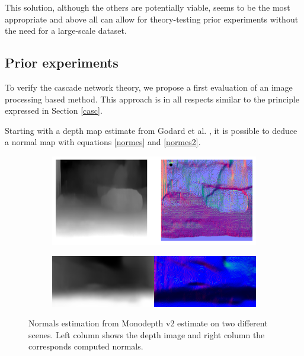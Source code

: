 This solution, although the others are potentially viable, seems to be the most appropriate and above all can allow for theory-testing prior experiments without the need for a large-scale dataset.

\subsection{Prior experiments}

To verify the cascade network theory, we propose a first evaluation of an image processing based method. This approach is in all respects similar to the principle expressed in Section \ref{casc}.

Starting with a depth map estimate from Godard et al. \cite{godard2019digging}, it is possible to deduce a normal map with equations \ref{normes} and \ref{normes2}.

\begin{figure}[h]
	\centering
	\begin{subfigure}[b]{.8\linewidth}  
		\centering
		\includegraphics[width=\linewidth]{Figures/Fusion/normals}
	\end{subfigure}

	\begin{subfigure}[b]{.8\linewidth}  
		\centering
		\includegraphics[width=\linewidth]{Figures/Fusion/godnorm}
	\end{subfigure}
	\caption[Normals estimation from Monodepth v2 estimate on two different scenes.]{Normals estimation from Monodepth v2 estimate on two different scenes. Left column shows the depth image and right column the corresponds computed normals.}
	\label{fig:godnorm}
\end{figure}

